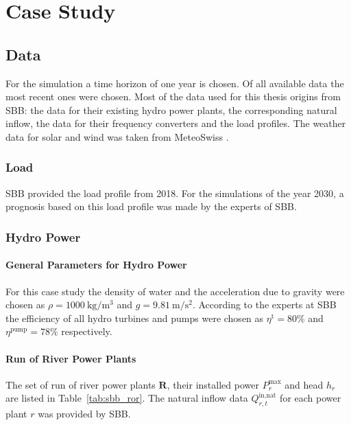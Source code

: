 \chapter{Case Study}

\section{Data}
For the simulation a time horizon of one year is chosen. Of all available data the most recent ones were chosen.
Most of the data used for this thesis origins from SBB: the data for their existing hydro power plants, the corresponding natural inflow, the data for their frequency converters and the load profiles. The weather data for solar and wind was taken from MeteoSwiss \cite{idaweb}. 

\subsection{Load}
SBB provided the load profile from 2018. For the simulations of the year 2030, a prognosis based on this load profile was made by the experts of SBB. 

\subsection{Hydro Power}
\subsubsection{General Parameters for Hydro Power}
For this case study the density of water and the acceleration due to gravity were chosen as 
$\rho = \SI{1000}{\kg\per\cubic\metre}$ and $g = \SI{9.81}{\metre\per\square\second}$. According to the experts at SBB the efficiency of all hydro turbines and pumps were chosen as $\eta^{\text{t}} = \si{80}{\%}$ and $\eta^{\text{pump}} = \si{78}{\%}$ respectively. 

\subsubsection{Run of River Power Plants}
The set of run of river power plants $\textbf{R}$, their installed power $P^{\text{max}}_{r}$ and head $h_r$ are listed in Table~\ref{tab:sbb_ror}. The natural inflow data $Q^{\text{in,nat}}_{r, t}$ for each power plant $r$ was provided by SBB.  

